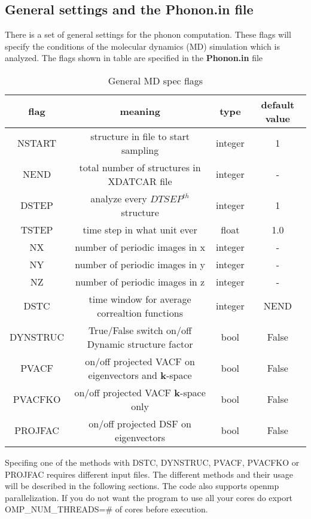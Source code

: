 \documentclass[a4paper,12pt]{article}
\begin{document}
\subsection{General settings and the Phonon.in file}
There is a set of general settings for the phonon computation.
These flags will specify the conditions of the molecular dynamics (MD)
simulation which is analyzed.
The flags shown in table are specified in the \textbf{Phonon.in} file

\begin{table}[h!]
	\centering
	\caption{General MD spec flags}
\begin{tabular}{ |c|c|c|c| }
 \hline
	flag & meaning & type & default value \\ 
 \hline
	NSTART & structure in file to start sampling & integer & 1 \\  
	NEND   & total number of structures in XDATCAR file & integer & - \\
	DSTEP  & analyze every $DTSEP^{th}$ structure & integer & 1 \\
	TSTEP  & time step in what unit ever    & float & 1.0 \\
	NX     & number of periodic images in x & integer & - \\
	NY     & number of periodic images in y & integer & - \\
	NZ     & number of periodic images in z & integer & - \\
	DSTC   & time window for average correaltion functions & integer & NEND \\
	DYNSTRUC & True/False switch on/off Dynamic structure factor & bool & False\\
	PVACF   & on/off projected VACF on eigenvectors and $\mathbf{k}$-space & bool & False\\
	PVACFKO & on/off projected VACF $\mathbf{k}$-space only & bool & False\\
	PROJFAC & on/off projected DSF on eigenvectors & bool & False\\
 \hline
\end{tabular}
\end{table}

Specifing one of the methods with DSTC, DYNSTRUC, PVACF, PVACFKO or PROJFAC requires
different input files. The different methods and their usage will be described in the
following sections. The code also supports openmp parallelization. If you do not want
the program to use all your cores do export OMP\_NUM\_THREADS=\# of cores before execution.
\end{document}
